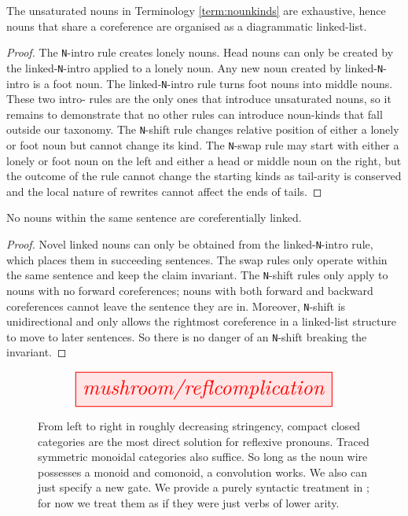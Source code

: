 \begin{lemma}\label{prop:linkedlist}
The unsaturated nouns in Terminology \ref{term:nounkinds} are exhaustive, hence nouns that share a coreference are organised as a diagrammatic linked-list.
\begin{proof}
The \texttt{N}-intro rule creates lonely nouns. Head nouns can only be created by the linked-\texttt{N}-intro applied to a lonely noun. Any new noun created by linked-\texttt{N}-intro is a foot noun. The linked-\texttt{N}-intro rule turns foot nouns into middle nouns. These two intro- rules are the only ones that introduce unsaturated nouns, so it remains to demonstrate that no other rules can introduce noun-kinds that fall outside our taxonomy. The \texttt{N}-shift rule changes relative position of either a lonely or foot noun but cannot change its kind. The \texttt{N}-swap rule may start with either a lonely or foot noun on the left and either a head or middle noun on the right, but the outcome of the rule cannot change the starting kinds as tail-arity is conserved and the local nature of rewrites cannot affect the ends of tails.
\end{proof}
\end{lemma}

\begin{lemma}\label{prop:norefl}
No nouns within the same sentence are coreferentially linked.
\begin{proof}
Novel linked nouns can only be obtained from the linked-\texttt{N}-intro rule, which places them in succeeding sentences. The swap rules only operate within the same sentence and keep the claim invariant. The \texttt{N}-shift rules only apply to nouns with no forward coreferences; nouns with both forward and backward coreferences cannot leave the sentence they are in. Moreover, \texttt{N}-shift is unidirectional and only allows the rightmost coreference in a linked-list structure to move to later sentences. So there is no danger of an \texttt{N}-shift breaking the invariant.
\end{proof}
\end{lemma}

\begin{figure}[h!]\label{fig:reflcomp}
\centering
\[
\resizebox{0.75\textwidth}{!}{\tikzfig{mushroom/reflcomplication}}
\]
\caption{From left to right in roughly decreasing stringency, compact closed categories are the most direct solution for reflexive pronouns. Traced symmetric monoidal categories also suffice. So long as the noun wire possesses a monoid and comonoid, a convolution works. We also can just specify a new gate. We provide a purely syntactic treatment in \citep{wang-mascianicaDistillingTextCircuits2023a}; for now we treat them as if they were just verbs of lower arity.}
\end{figure}

